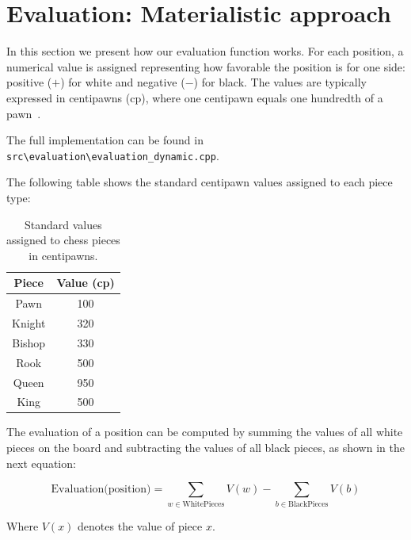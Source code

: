 \section{Evaluation: Materialistic approach}\label{sec:evaluation}

In this section we present how our evaluation function works. For each position, a numerical value is assigned representing how favorable the position is for one side: positive ($+$) for white and negative ($-$) for black. The values are typically expressed in centipawns (cp), where one centipawn equals one hundredth of a pawn~\cite{Shannon1950}.

\vspace{1em}

\noindent \parbox{\textwidth}{The full implementation can be found in \texttt{src\textbackslash{}evaluation\textbackslash{}evaluation\_dynamic.cpp}.}

\vspace{1em}

\noindent The following table shows the standard centipawn values assigned to each piece type:

\begin{table}[H]
    \centering
    \begin{tabular}{|c|c|}
        \hline
        Piece & Value (cp)\\ \hline
        Pawn & 100 \\ \hline
        Knight & 320 \\ \hline
        Bishop & 330 \\ \hline
        Rook & 500 \\ \hline
        Queen & 950 \\ \hline
        King & 500 \\ \hline
    \end{tabular}
    \caption{Standard values assigned to chess pieces in centipawns.}
\end{table}

\noindent The evaluation of a position can be computed by summing the values of all white pieces on the board and subtracting the values of all black pieces, as shown in the next equation:

\begin{equation*}
    \text{Evaluation(position)} = \sum_{w \in \text{WhitePieces}} V(w) - \sum_{b \in \text{BlackPieces}} V(b)
\end{equation*}

\noindent Where $V(x)$ denotes the value of piece $x$.

